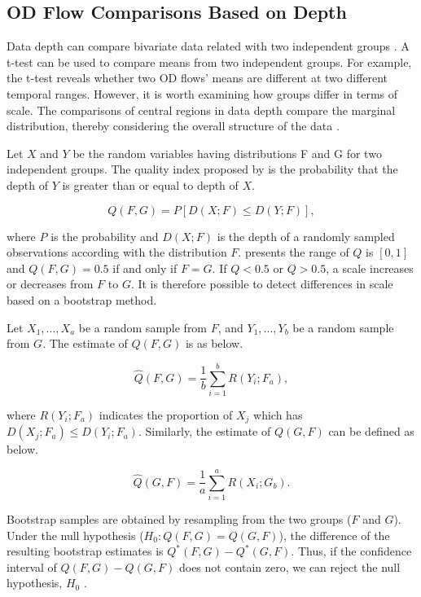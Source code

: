 \documentclass[a4paper,UKenglish]{lipics-v2016}
\begin{document}
\subsection{OD Flow Comparisons Based on Depth}
Data depth can compare bivariate data related with two independent groups \cite{liu93JASA}. 
A t-test can be used to compare means from two independent groups.
For example, the t-test reveals whether two OD flows' means are different at two different temporal ranges.
However, it is worth examining how groups differ in terms of scale.
The comparisons of central regions in data depth compare the marginal distribution, thereby considering the overall structure of the data \cite{wilcox03MBR}.

Let $X$ and $Y$ be the random variables having distributions F and G for two independent groups. The quality index proposed by \cite{liu93JASA} is the probability that the depth of $Y$ is greater than or equal to depth of $X$. 

\begin{equation*}
Q(F,G) = P[D(X;F) \leq D(Y;F)],
\end{equation*}

where $P$ is the probability and $D(X;F)$ is the depth of a randomly sampled observations according with the distribution $F$. \cite{liu93JASA} presents the range of $Q$ is $[0,1]$ and $Q(F,G) = 0.5$ if and only if $F = G$. If $Q < 0.5$  or $Q > 0.5$, a scale increases or decreases from  $F$ to $G$.   It is therefore possible to detect differences in scale based on a bootstrap method.

Let $X_1,...,X_a$ be a random sample from $F$, and $Y_1,...,Y_b$ be a random sample from $G$. The estimate of $Q(F,G)$ is as below.

\begin{equation*}
\hat{Q}(F,G) =\frac{1}{b} \sum_{i=1}^{b} R(Y_i;F_a),
\end{equation*}

where $R(Y_i;F_a)$ indicates the proportion of $X_j$ which has $D(X_j;F_a) \leq D(Y_i;F_a)$. Similarly, the estimate of $Q(G,F)$ can be defined as below.

\begin{equation*}
\hat{Q}(G,F) =\frac{1}{a} \sum_{i=1}^{a} R(X_i;G_b).
\end{equation*}

Bootstrap samples are obtained by resampling from the two groups ($F$ and $G$). Under the null hypothesis ($H_0: Q(F,G) = Q(G,F)$), the difference of the resulting bootstrap estimates is $Q^*(F,G) - Q^*(G,F)$. Thus, if the confidence interval of $Q(F,G) - Q(G,F)$ does not contain zero, we can reject the null hypothesis, $H_0$ \cite{liu93JASA,wilcox03MBR}.
\end{document}

